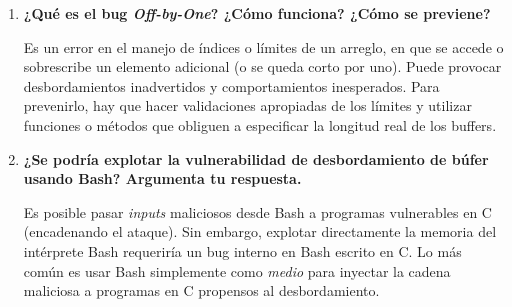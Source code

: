 \begin{enumerate}
    \item \textbf{¿Qué es el bug \textit{Off-by-One}? ¿Cómo funciona? ¿Cómo se previene?}

    Es un error en el manejo de índices o límites de un arreglo, en que se accede o sobrescribe 
    un elemento adicional (o se queda corto por uno). Puede provocar desbordamientos 
    inadvertidos y comportamientos inesperados. Para prevenirlo, hay que hacer validaciones 
    apropiadas de los límites y utilizar funciones o métodos que obliguen a especificar la 
    longitud real de los buffers\citep{howard2003}.

    \item \textbf{¿Se podría explotar la vulnerabilidad de desbordamiento de búfer usando Bash? Argumenta tu respuesta.}

    Es posible pasar \textit{inputs} maliciosos desde Bash a programas vulnerables en C 
    (encadenando el ataque). Sin embargo, explotar directamente la memoria del intérprete 
    Bash requeriría un bug interno en Bash escrito en C. Lo más común es usar Bash 
    simplemente como \textit{medio} para inyectar la cadena maliciosa a programas en C 
    propensos al desbordamiento.
    
\end{enumerate}
